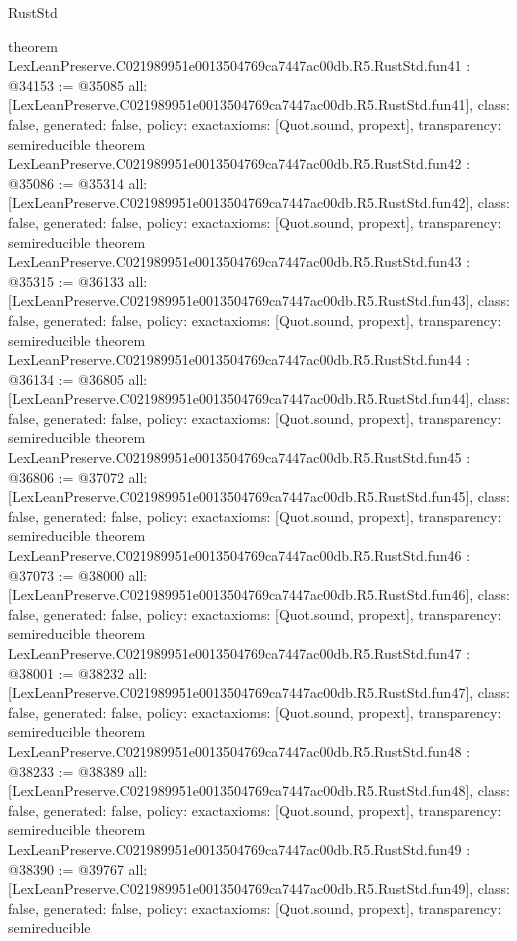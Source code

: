 \begin{lexlean}{RustStd}
\begin{coremodule}
{}
theorem LexLeanPreserve.C021989951e0013504769ca7447ac00db.R5.RustStd.fun41 : @34153 := @35085 {
  all: [LexLeanPreserve.C021989951e0013504769ca7447ac00db.R5.RustStd.fun41],
  class: false,
  generated: false,
  policy: exact{axioms: [Quot.sound, propext]},
  transparency: semireducible
}
theorem LexLeanPreserve.C021989951e0013504769ca7447ac00db.R5.RustStd.fun42 : @35086 := @35314 {
  all: [LexLeanPreserve.C021989951e0013504769ca7447ac00db.R5.RustStd.fun42],
  class: false,
  generated: false,
  policy: exact{axioms: [Quot.sound, propext]},
  transparency: semireducible
}
theorem LexLeanPreserve.C021989951e0013504769ca7447ac00db.R5.RustStd.fun43 : @35315 := @36133 {
  all: [LexLeanPreserve.C021989951e0013504769ca7447ac00db.R5.RustStd.fun43],
  class: false,
  generated: false,
  policy: exact{axioms: [Quot.sound, propext]},
  transparency: semireducible
}
theorem LexLeanPreserve.C021989951e0013504769ca7447ac00db.R5.RustStd.fun44 : @36134 := @36805 {
  all: [LexLeanPreserve.C021989951e0013504769ca7447ac00db.R5.RustStd.fun44],
  class: false,
  generated: false,
  policy: exact{axioms: [Quot.sound, propext]},
  transparency: semireducible
}
theorem LexLeanPreserve.C021989951e0013504769ca7447ac00db.R5.RustStd.fun45 : @36806 := @37072 {
  all: [LexLeanPreserve.C021989951e0013504769ca7447ac00db.R5.RustStd.fun45],
  class: false,
  generated: false,
  policy: exact{axioms: [Quot.sound, propext]},
  transparency: semireducible
}
theorem LexLeanPreserve.C021989951e0013504769ca7447ac00db.R5.RustStd.fun46 : @37073 := @38000 {
  all: [LexLeanPreserve.C021989951e0013504769ca7447ac00db.R5.RustStd.fun46],
  class: false,
  generated: false,
  policy: exact{axioms: [Quot.sound, propext]},
  transparency: semireducible
}
theorem LexLeanPreserve.C021989951e0013504769ca7447ac00db.R5.RustStd.fun47 : @38001 := @38232 {
  all: [LexLeanPreserve.C021989951e0013504769ca7447ac00db.R5.RustStd.fun47],
  class: false,
  generated: false,
  policy: exact{axioms: [Quot.sound, propext]},
  transparency: semireducible
}
theorem LexLeanPreserve.C021989951e0013504769ca7447ac00db.R5.RustStd.fun48 : @38233 := @38389 {
  all: [LexLeanPreserve.C021989951e0013504769ca7447ac00db.R5.RustStd.fun48],
  class: false,
  generated: false,
  policy: exact{axioms: [Quot.sound, propext]},
  transparency: semireducible
}
theorem LexLeanPreserve.C021989951e0013504769ca7447ac00db.R5.RustStd.fun49 : @38390 := @39767 {
  all: [LexLeanPreserve.C021989951e0013504769ca7447ac00db.R5.RustStd.fun49],
  class: false,
  generated: false,
  policy: exact{axioms: [Quot.sound, propext]},
  transparency: semireducible
}
\end{coremodule}
\end{lexlean}
